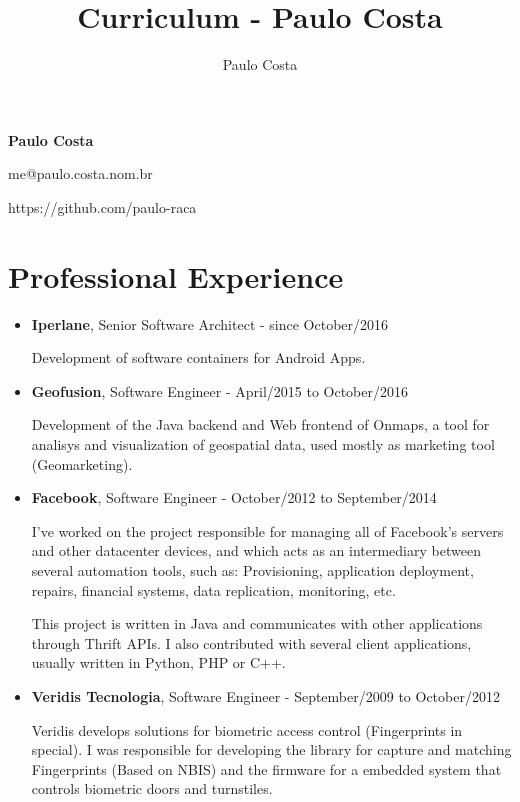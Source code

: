 \documentclass[a4paper,10pt]{article}
\title{Curriculum - Paulo Costa}
\author{Paulo Costa}
\begin{document}
  \LARGE\textbf{Paulo Costa}

  \large me@paulo.costa.nom.br
  
  \large https://github.com/paulo-raca



  \normalsize 
  
  \section{Professional Experience}
    \begin{itemize}
      \item
        \textbf{Iperlane}, Senior Software Architect - since October/2016

        Development of software containers for Android Apps.

      \item
        \textbf{Geofusion}, Software Engineer - April/2015 to October/2016
        
        Development of the Java backend and Web frontend of Onmaps, a tool for analisys and visualization of geospatial data, used mostly as marketing tool (Geomarketing).

      \item
        \textbf{Facebook}, Software Engineer - October/2012 to September/2014
        
        I've worked on the project responsible for managing all of Facebook's servers and other datacenter devices, and which acts as an intermediary between several automation tools, such as: Provisioning, application deployment, repairs, financial systems, data replication, monitoring, etc.
        
        This project is written in Java and communicates with other applications through Thrift APIs. I also contributed with several client applications, usually written in Python, PHP or C++.

    
      \item  
        \textbf{Veridis Tecnologia}, Software Engineer - September/2009 to October/2012

        Veridis develops solutions for biometric access control (Fingerprints in special). I was responsible for developing the library for capture and  matching Fingerprints (Based on NBIS) and the firmware for a embedded system that controls biometric doors and turnstiles.
        

\end{itemize}
\end{document}
